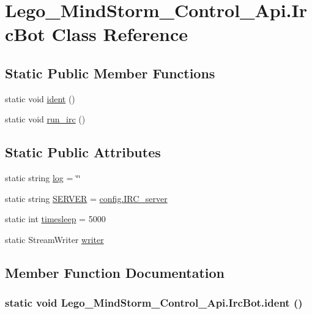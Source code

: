 \hypertarget{class_lego___mind_storm___control___api_1_1_irc_bot}{
\section{Lego\_\-MindStorm\_\-Control\_\-Api.IrcBot Class Reference}
\label{class_lego___mind_storm___control___api_1_1_irc_bot}
}
\subsection*{Static Public Member Functions}
\begin{CompactItemize}
\item 
static void \hyperlink{class_lego___mind_storm___control___api_1_1_irc_bot_bcd43141bb1fd519155b49d0c6546697}{ident} ()
\item 
static void \hyperlink{class_lego___mind_storm___control___api_1_1_irc_bot_f2b468ac038355a98db5bbdca4f9e21f}{run\_\-irc} ()
\end{CompactItemize}
\subsection*{Static Public Attributes}
\begin{CompactItemize}
\item 
static string \hyperlink{class_lego___mind_storm___control___api_1_1_irc_bot_1ec85d48edfe39946b4231de41d8a532}{log} = \char`\"{}\char`\"{}
\item 
static string \hyperlink{class_lego___mind_storm___control___api_1_1_irc_bot_5f338616b695cf4623dfacfab911fb47}{SERVER} = \hyperlink{class_lego___mind_storm___control___api_1_1config_cf8a9bb7b9b80aa8223c5d6570589588}{config.IRC\_\-server}
\item 
static int \hyperlink{class_lego___mind_storm___control___api_1_1_irc_bot_1f3f263ea140bc708bc1dbaa19c12776}{timesleep} = 5000
\item 
static StreamWriter \hyperlink{class_lego___mind_storm___control___api_1_1_irc_bot_a2ff9fcaa402bb836bd7b73a083035e9}{writer}
\end{CompactItemize}


\subsection{Member Function Documentation}
\hypertarget{class_lego___mind_storm___control___api_1_1_irc_bot_bcd43141bb1fd519155b49d0c6546697}{
\subsubsection[{ident}]{\setlength{\rightskip}{0pt plus 5cm}static void Lego\_\-MindStorm\_\-Control\_\-Api.IrcBot.ident ()}}
\label{class_lego___mind_storm___control___api_1_1_irc_bot_bcd43141bb1fd519155b49d0c6546697}


